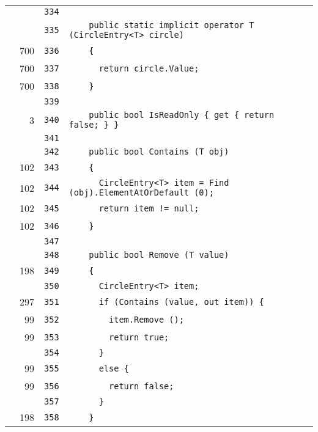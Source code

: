 \documentclass[a4paper,10pt]{article}
\begin{document}
\begin{longtable}[l]{lrrl}
\cellcolor{gray} &  & \verb~334~ & \verb~~\\
\cellcolor{gray} &  & \verb~335~ & \verb~    public static implicit operator T (CircleEntry<T> circle)~\\
\cellcolor{green} & 700 & \verb~336~ & \verb~    {~\\
\cellcolor{green} & 700 & \verb~337~ & \verb~      return circle.Value;~\\
\cellcolor{green} & 700 & \verb~338~ & \verb~    }~\\
\cellcolor{gray} &  & \verb~339~ & \verb~~\\
\cellcolor{green} & 3 & \verb~340~ & \verb~    public bool IsReadOnly { get { return false; } }~\\
\cellcolor{gray} &  & \verb~341~ & \verb~~\\
\cellcolor{gray} &  & \verb~342~ & \verb~    public bool Contains (T obj)~\\
\cellcolor{green} & 102 & \verb~343~ & \verb~    {~\\
\cellcolor{green} & 102 & \verb~344~ & \verb~      CircleEntry<T> item = Find (obj).ElementAtOrDefault (0);~\\
\cellcolor{green} & 102 & \verb~345~ & \verb~      return item != null;~\\
\cellcolor{green} & 102 & \verb~346~ & \verb~    }~\\
\cellcolor{gray} &  & \verb~347~ & \verb~~\\
\cellcolor{gray} &  & \verb~348~ & \verb~    public bool Remove (T value)~\\
\cellcolor{green} & 198 & \verb~349~ & \verb~    {~\\
\cellcolor{gray} &  & \verb~350~ & \verb~      CircleEntry<T> item;~\\
\cellcolor{green} & 297 & \verb~351~ & \verb~      if (Contains (value, out item)) {~\\
\cellcolor{green} & 99 & \verb~352~ & \verb~        item.Remove ();~\\
\cellcolor{green} & 99 & \verb~353~ & \verb~        return true;~\\
\cellcolor{gray} &  & \verb~354~ & \verb~      }~\\
\cellcolor{green} & 99 & \verb~355~ & \verb~      else {~\\
\cellcolor{green} & 99 & \verb~356~ & \verb~        return false;~\\
\cellcolor{gray} &  & \verb~357~ & \verb~      }~\\
\cellcolor{green} & 198 & \verb~358~ & \verb~    }~\\

\end{longtable}
\end{document}
